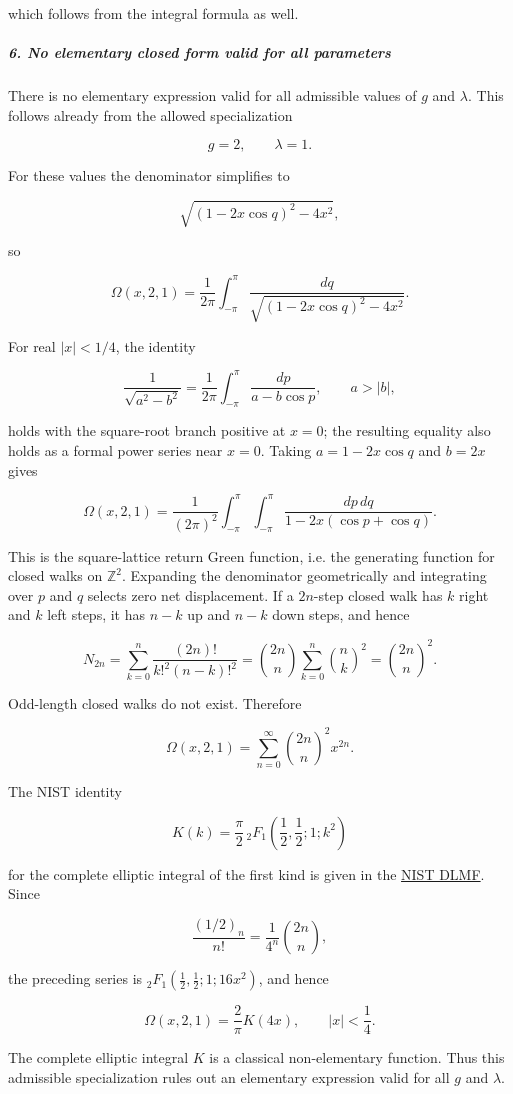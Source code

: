 which follows from the integral formula as well.

\subparagraph*{6. No elementary closed form valid for all parameters}

There is no elementary expression valid for all admissible values of $g$ and $\lambda$. This follows already from the allowed specialization

\[
g=2,\qquad \lambda=1.
\]

For these values the denominator simplifies to

\[
\sqrt{\left(1-2x\cos q\right)^2-4x^2},
\]

so

\[
\Omega(x,2,1) = \frac{1}{2\pi} \int_{-\pi}^{\pi} \frac{dq}{ \sqrt{\left(1-2x\cos q\right)^2-4x^2} }.
\]

For real $|x|<1/4$, the identity

\[
\frac{1}{\sqrt{a^2-b^2}} = \frac{1}{2\pi} \int_{-\pi}^{\pi} \frac{dp}{a-b\cos p},
\qquad a>|b|,
\]

holds with the square-root branch positive at $x=0$; the resulting equality also holds as a formal power series near $x=0$. Taking $a=1-2x\cos q$ and $b=2x$ gives

\[
\Omega(x,2,1) = \frac{1}{(2\pi)^2} \int_{-\pi}^{\pi}\int_{-\pi}^{\pi} \frac{dp\,dq}{ 1-2x(\cos p+\cos q) }.
\]

This is the square-lattice return Green function, i.e. the generating function for closed walks on $\mathbb Z^2$. Expanding the denominator geometrically and integrating over $p$ and $q$ selects zero net displacement. If a $2n$-step closed walk has $k$ right and $k$ left steps, it has $n-k$ up and $n-k$ down steps, and hence

\[
N_{2n}=\sum_{k=0}^{n}\frac{(2n)!}{k!^2(n-k)!^2}
=\binom{2n}{n}\sum_{k=0}^{n}\binom{n}{k}^2
=\binom{2n}{n}^2.
\]

Odd-length closed walks do not exist. Therefore

\[
\Omega(x,2,1) = \sum_{n=0}^{\infty} \binom{2n}{n}^{\!2}x^{2n}.
\]

The NIST identity

\[
K(k) = \frac{\pi}{2}\, {}_2F_1\left(\frac12,\frac12;1;k^2\right)
\]

for the complete elliptic integral of the first kind is given in the \href{\detokenize{https://dlmf.nist.gov/15.9.E24}}{NIST DLMF}. Since

\[
\frac{(1/2)_n}{n!}=\frac{1}{4^n}\binom{2n}{n},
\]

the preceding series is ${}_2F_1(\frac12,\frac12;1;16x^2)$, and hence

\[
\Omega(x,2,1)=\frac{2}{\pi}K(4x), \qquad |x|<\frac14.
\]

The complete elliptic integral $K$ is a classical non-elementary function. Thus this admissible specialization rules out an elementary expression valid for all $g$ and $\lambda$.
